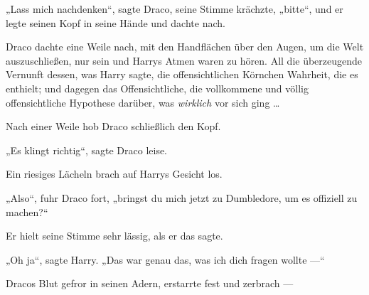 „Lass mich nachdenken“, sagte Draco, seine Stimme krächzte, „bitte“, und er legte seinen Kopf in seine Hände und dachte nach.

\later

Draco dachte eine Weile nach, mit den Handflächen über den Augen, um die Welt auszuschließen, nur sein und Harrys Atmen waren zu hören. All die überzeugende Vernunft dessen, was Harry sagte, die offensichtlichen Körnchen Wahrheit, die es enthielt; und dagegen das Offensichtliche, die vollkommene und völlig offensichtliche Hypothese darüber, was \emph{wirklich} vor sich ging …

Nach einer Weile hob Draco schließlich den Kopf.

„Es klingt richtig“, sagte Draco leise.

Ein riesiges Lächeln brach auf Harrys Gesicht los.

„Also“, fuhr Draco fort, „bringst du mich jetzt zu Dumbledore, um es offiziell zu machen?“

Er hielt seine Stimme sehr lässig, als er das sagte.

„Oh ja“, sagte Harry.
„Das war genau das, was ich dich fragen wollte —“

Dracos Blut gefror in seinen Adern, erstarrte fest und zerbrach —

